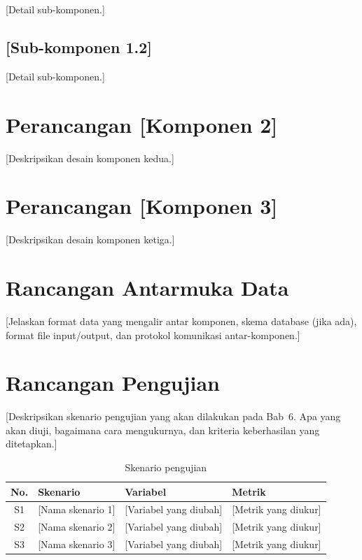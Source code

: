 [Detail sub-komponen.]

\subsection{[Sub-komponen 1.2]}
\label{sec:4.2.2}

[Detail sub-komponen.]

\section{Perancangan [Komponen 2]}
\label{sec:4.3}

[Deskripsikan desain komponen kedua.]

\section{Perancangan [Komponen 3]}
\label{sec:4.4}

[Deskripsikan desain komponen ketiga.]

\section{Rancangan Antarmuka Data}
\label{sec:4.5}

[Jelaskan format data yang mengalir antar komponen, skema database (jika ada), format
file input/output, dan protokol komunikasi antar-komponen.]


\section{Rancangan Pengujian}
\label{sec:4.6}

[Deskripsikan skenario pengujian yang akan dilakukan pada Bab~6. Apa yang akan diuji,
bagaimana cara mengukurnya, dan kriteria keberhasilan yang ditetapkan.]

\begin{table}[H]
  \centering
  \caption{Skenario pengujian}
  \label{tab:4.skenario}
  \begin{tabular}{clll}
    \toprule
    \textbf{No.} & \textbf{Skenario} & \textbf{Variabel} & \textbf{Metrik} \\
    \midrule
    S1 & [Nama skenario 1] & [Variabel yang diubah] & [Metrik yang diukur] \\
    S2 & [Nama skenario 2] & [Variabel yang diubah] & [Metrik yang diukur] \\
    S3 & [Nama skenario 3] & [Variabel yang diubah] & [Metrik yang diukur] \\
    \bottomrule
  \end{tabular}
\end{table}

